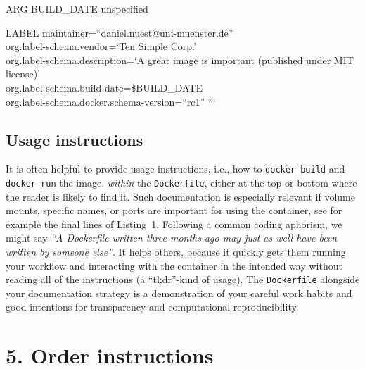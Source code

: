 \documentclass[10pt,letterpaper]{article}
\begin{document}
ARG BUILD\_DATE unspecified

LABEL maintainer=``daniel.nuest@uni-muenster.de''\\
org.label-schema.vendor=`Ten Simple Corp.'\\
org.label-schema.description=`A great image is important (published
under MIT license)'\\
org.label-schema.build-date=\$BUILD\_DATE\\
org.label-schema.docker.schema-version=``rc1'' ```

\normalsize

\hypertarget{usage-instructions}{%
\subsection{Usage instructions}\label{usage-instructions}}

It is often helpful to provide usage instructions, i.e., how to
\texttt{docker\ build} and \texttt{docker\ run} the image, \emph{within}
the \texttt{Dockerfile}, either at the top or bottom where the reader is
likely to find it. Such documentation is especially relevant if volume
mounts, specific names, or ports are important for using the container,
see for example the final lines of Listing~1. Following a common coding
aphorism, we might say \emph{``A Dockerfile written three months ago may
just as well have been written by someone else''}. It helps others,
because it quickly gets them running your workflow and interacting with
the container in the intended way without reading all of the
instructions (a
\href{https://en.wikipedia.org/wiki/Wikipedia:Too_long;_didn\%27t_read}{``tl;dr''}-kind
of usage). The \texttt{Dockerfile} alongside your documentation strategy
is a demonstration of your careful work habits and good intentions for
transparency and computational reproducibility.

\hypertarget{order-instructions}{%
\section{5. Order instructions}\label{order-instructions}}

  \label{rule:order} 
\end{document}
